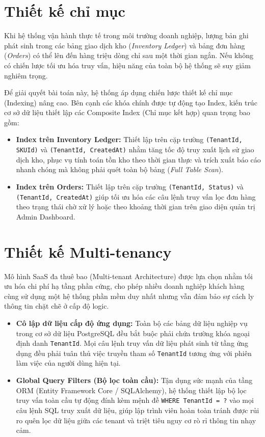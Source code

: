 \documentclass[12pt,a4paper]{report}
\begin{document}
	\section{Thiết kế chỉ mục}
	Khi hệ thống vận hành thực tế trong môi trường doanh nghiệp, lượng bản ghi phát sinh trong các bảng giao dịch kho (\textit{Inventory Ledger}) và bảng đơn hàng (\textit{Orders}) có thể lên đến hàng triệu dòng chỉ sau một thời gian ngắn. Nếu không có chiến lược tối ưu hóa truy vấn, hiệu năng của toàn bộ hệ thống sẽ suy giảm nghiêm trọng.
	\par
	Để giải quyết bài toán này, hệ thống áp dụng chiến lược thiết kế chỉ mục (Indexing) nâng cao. Bên cạnh các khóa chính được tự động tạo Index, kiến trúc cơ sở dữ liệu thiết lập các Composite Index (Chỉ mục kết hợp) quan trọng bao gồm:
	\begin{itemize}
		\item \textbf{Index trên Inventory Ledger:} Thiết lập trên cặp trường \texttt{(TenantId, SKUId)} và \texttt{(TenantId, CreatedAt)} nhằm tăng tốc độ truy xuất lịch sử giao dịch kho, phục vụ tính toán tồn kho theo thời gian thực và trích xuất báo cáo nhanh chóng mà không phải quét toàn bộ bảng (\textit{Full Table Scan}).
		\item \textbf{Index trên Orders:} Thiết lập trên cặp trường \texttt{(TenantId, Status)} và \texttt{(TenantId, CreatedAt)} giúp tối ưu hóa các câu lệnh truy vấn lọc đơn hàng theo trạng thái chờ xử lý hoặc theo khoảng thời gian trên giao diện quản trị Admin Dashboard.
	\end{itemize}
	
	\section{Thiết kế Multi-tenancy}
	Mô hình SaaS đa thuê bao (Multi-tenant Architecture) được lựa chọn nhằm tối ưu hóa chi phí hạ tầng phần cứng, cho phép nhiều doanh nghiệp khách hàng cùng sử dụng một hệ thống phần mềm duy nhất nhưng vẫn đảm bảo sự cách ly thông tin chặt chẽ ở cấp độ logic.
	\par
	\begin{itemize}
		\item \textbf{Cô lập dữ liệu cấp độ ứng dụng:} Toàn bộ các bảng dữ liệu nghiệp vụ trong cơ sở dữ liệu PostgreSQL đều bắt buộc phải chứa trường khóa ngoại định danh \texttt{TenantId}. Mọi câu lệnh truy vấn dữ liệu phát sinh từ tầng ứng dụng đều phải tuân thủ việc truyền tham số \texttt{TenantId} tương ứng với phiên làm việc của người dùng hiện tại.
		\item \textbf{Global Query Filters (Bộ lọc toàn cầu):} Tận dụng sức mạnh của tầng ORM (Entity Framework Core / SQLAlchemy), hệ thống thiết lập bộ lọc truy vấn toàn cầu tự động đính kèm mệnh đề \texttt{WHERE TenantId = ?} vào mọi câu lệnh SQL truy xuất dữ liệu, giúp lập trình viên hoàn toàn tránh được rủi ro quên lọc dữ liệu giữa các tenant và triệt tiêu nguy cơ rò rỉ thông tin nhạy cảm.
	\end{itemize}
	
\end{document}
